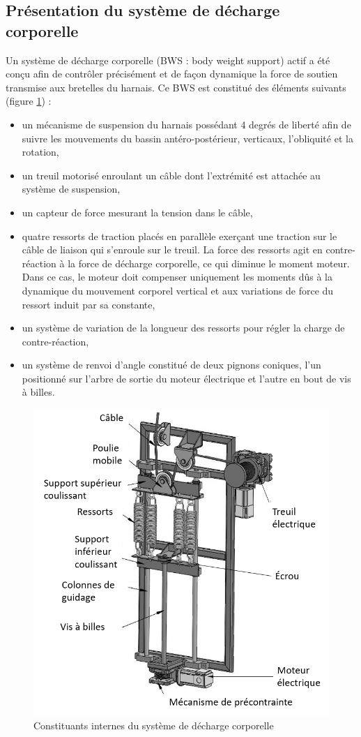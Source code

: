 \subsection{Présentation du système de décharge corporelle}

Un système de décharge corporelle (BWS : body weight support) actif a été conçu afin de contrôler précisément et de façon dynamique la force de soutien transmise aux bretelles du harnais. Ce BWS est constitué des éléments suivants (figure \ref{fig16}) :
\begin{itemize}
 \item un mécanisme de suspension du harnais possédant 4 degrés de liberté afin de suivre les mouvements du bassin antéro-postérieur, verticaux, l'obliquité et la rotation,
 \item un treuil motorisé enroulant un câble dont l'extrémité est attachée au système de suspension,
 \item un capteur de force mesurant la tension dans le câble,
 \item quatre ressorts de traction placés en parallèle exerçant une traction sur le câble de liaison qui s'enroule sur le treuil. La force des ressorts agit en contre-réaction à la force de décharge corporelle, ce qui diminue le moment moteur. Dans ce cas, le moteur doit compenser uniquement les moments dûs à la dynamique du mouvement corporel vertical et aux variations de force du ressort induit par sa constante,
 \item un système de variation de la longueur des ressorts pour régler la charge de contre-réaction,
 \item un système de renvoi d'angle constitué de deux pignons coniques, l'un positionné sur l'arbre de sortie du moteur électrique et l'autre en bout de vis à billes.
\end{itemize}

\begin{figure}[ht!]
\begin{center}
 \includegraphics[width=0.6\linewidth]{img/fig16}
\end{center}
\caption{\label{fig16} Constituants internes du système de décharge corporelle}
\end{figure}

